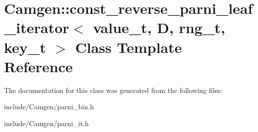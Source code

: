 \hypertarget{a00100}{}\section{Camgen\+:\+:const\+\_\+reverse\+\_\+parni\+\_\+leaf\+\_\+iterator$<$ value\+\_\+t, D, rng\+\_\+t, key\+\_\+t $>$ Class Template Reference}
\label{a00100}


The documentation for this class was generated from the following files\+:\begin{DoxyCompactItemize}
\item 
include/\+Camgen/parni\+\_\+bin.\+h\item 
include/\+Camgen/parni\+\_\+it.\+h\end{DoxyCompactItemize}

